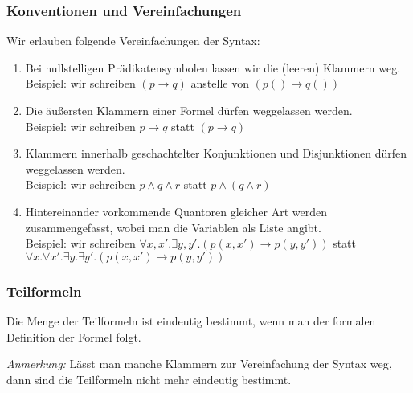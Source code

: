 \documentclass[onlymath]{beamer}
\begin{document}
\begin{frame}\frametitle{Konventionen und Vereinfachungen}

Wir erlauben folgende \alert{Vereinfachungen der Syntax:}\pause
\begin{enumerate}[(1)]
\item Bei nullstelligen Prädikatensymbolen lassen wir die (leeren) Klammern weg.\\
Beispiel: wir schreiben $(p\to q)$ anstelle von $(p()\to q())$\pause
%
\item Die äußersten Klammern einer Formel dürfen weggelassen werden.\\
Beispiel: wir schreiben $p\to q$ statt $(p\to q)$\pause
%
\item Klammern innerhalb geschachtelter Konjunktionen und Disjunktionen dürfen
weggelassen werden.\\
Beispiel: wir schreiben $p\wedge q\wedge r$ statt $p\wedge (q\wedge r)$\pause
%
\item Hintereinander vorkommende Quantoren gleicher Art werden zusammengefasst, wobei man die Variablen als Liste angibt.\\
Beispiel: wir schreiben $\forall x,x'.\exists y,y'.(p(x,x')\to p(y,y'))$ statt $\forall x.\forall x'.\exists y.\exists y'.(p(x,x')\to p(y,y'))$\pause
\end{enumerate}


\end{frame}


\begin{frame}\frametitle{Teilformeln}


Die Menge der Teilformeln ist eindeutig bestimmt, wenn man der formalen 
Definition der Formel folgt.


\pause\emph{Anmerkung:} Lässt man manche Klammern zur Vereinfachung der Syntax weg, dann 
sind die Teilformeln nicht mehr eindeutig bestimmt.


\end{frame}
\end{document}
